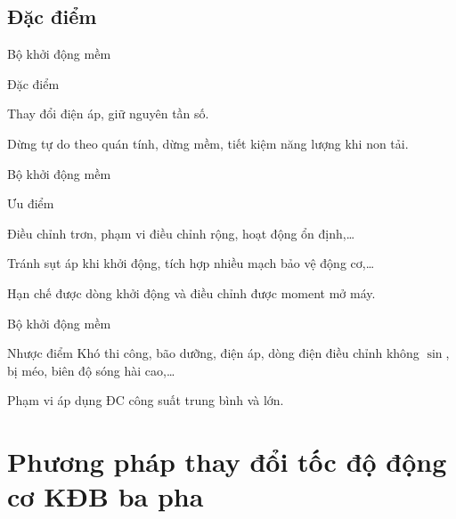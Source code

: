 \documentclass[20pt]{beamer}
\begin{document}
\subsection*{Đặc điểm}
\begin{frame}{Bộ khởi động mềm}
	\begin{block}{Đặc điểm}
		\begin{list}{--}{}
			\justifying
			\item Thay đổi điện áp, giữ nguyên tần số. 
			\item Dừng tự do theo quán tính, dừng mềm, tiết kiệm năng lượng khi non tải.
		\end{list}
	\end{block}
\end{frame}

\begin{frame}{Bộ khởi động mềm}
	\begin{block}{Ưu điểm}
		\begin{list}{--}{}
			\justifying
			\item Điều chỉnh trơn, phạm vi điều chỉnh rộng, hoạt động ổn định,\ldots
			\item Tránh sụt áp khi khởi động, tích hợp nhiều mạch bảo vệ động cơ,\ldots
			\item Hạn chế được dòng khởi động và điều chỉnh được moment mở máy.
		\end{list}
	\end{block}
\end{frame}

\begin{frame}{Bộ khởi động mềm}
	\justifying	
	\begin{block}{Nhược điểm}
		Khó thi công, bão dưỡng, điện áp, dòng điện điều chỉnh không $\sin$, bị méo, biên độ sóng hài cao,\ldots
	\end{block}
	\begin{block}{Phạm vi áp dụng}
		ĐC công suất trung bình và lớn.
	\end{block}
\end{frame}


\section[Thay đổi tốc độ động cơ KĐB ba pha]{Phương pháp thay đổi tốc độ động cơ KĐB ba pha}
\end{document}
